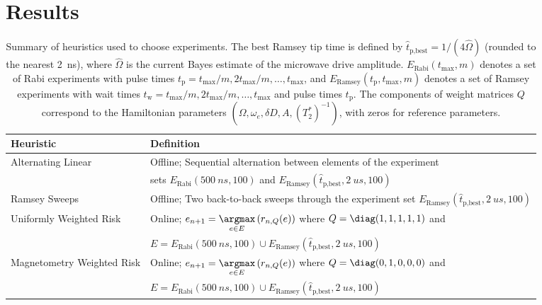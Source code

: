 \documentclass[aps,nofootinbib,twocolumn,superscriptaddress]{revtex4}
\newcommand{\Rabi}{\text{Rabi}}
\newcommand{\Ramsey}{\text{Ramsey}}
\newcommand{\tp}{t_\text{p}}
\newcommand{\tw}{t_\text{w}}
\begin{document}
\section{Results}
\label{sec:results}

\newcommand{\mystrut}{\rule{0pt}{1.5\normalbaselineskip}}
\begin{table*}[t]
    \centering
    \begin{tabularx}{\textwidth}{m{15em}X}
        \textbf{Heuristic} & \textbf{Definition} \\
        \hline\mystrut
        Alternating Linear
            & Offline; Sequential alternation between elements of
                the experiment \\
                & sets
                $E_\Rabi(\SI{500}{ns},100)$ and
                $E_\Ramsey(\hat{t}_{\text{p,best}},\SI{2}{us},100)$ \\
        \hline\mystrut
        Ramsey Sweeps
            & Offline;
                Two back-to-back sweeps through
                the experiment set
                $E_\Ramsey(\hat{t}_{\text{p,best}},\SI{2}{us},100)$ \\
        \hline\mystrut
        Uniformly Weighted Risk
            & Online;
                $e_{n+1}=\underset{e\in E}{\argmax}\left(r_{n,Q}(e)\right)$
                where $Q=\diag(1,1,1,1,1)$ and \\
                & $E=E_\Rabi(\SI{500}{ns},100)\cup
                E_\Ramsey(\hat{t}_{\text{p,best}},\SI{2}{us},100)$ \\
        \hline\mystrut
        Magnetometry Weighted Risk
            & Online;
                    $e_{n+1}=\underset{e\in E}{\argmax}\left(r_{n,Q}(e)\right)$
                    where $Q=\diag(0,1,0,0,0)$ and \\
                    & $E=E_\Rabi(\SI{500}{ns},100)\cup
                    E_\Ramsey(\hat{t}_{\text{p,best}},\SI{2}{us},100)$ \\
        \hline
    \end{tabularx}
    \caption{Summary of heuristics used to choose experiments.
        The best Ramsey tip time is defined by
        $\hat{t}_{\text{p,best}}=1/(4\hat{\Omega})$ (rounded to the nearest
        \SI{2}{ns}), where $\hat\Omega$ is the current
        Bayes estimate of the microwave drive amplitude.
        $E_\Rabi(t_{\max},m)$ denotes a set of Rabi experiments with pulse
        times $\tp=t_{\max}/m,2t_{\max}/m,\ldots,t_{\max}$, and
        $E_\Ramsey(\tp, t_{\max},m)$ denotes a set of Ramsey experiments with wait times
        $\tw=t_{\max}/m,2t_{\max}/m,\ldots,t_{\max}$ and pulse times $\tp$.
        The components of weight matrices $Q$ correspond to the
        Hamiltonian parameters
        $(\Omega,\omega_e,\delta D,A,(T_2^*)^{-1})$, with
        zeros for reference parameters.
    }
    \label{tab:heuristics}
\end{table*}
\end{document}
